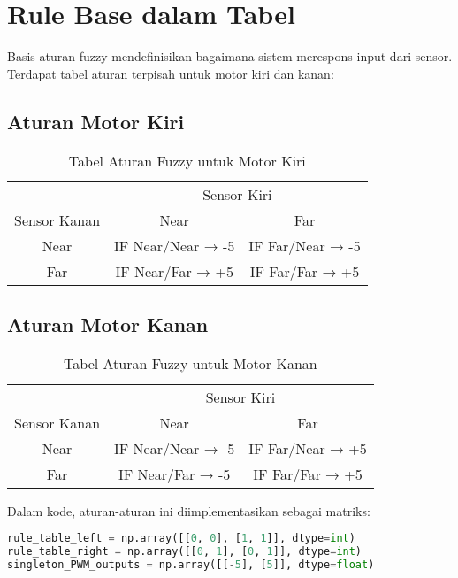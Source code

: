 \documentclass[a4paper,11pt]{article}
\begin{document}
\section{Rule Base dalam Tabel}
Basis aturan fuzzy mendefinisikan bagaimana sistem merespons input dari sensor. Terdapat tabel aturan terpisah untuk motor kiri dan kanan:

\subsection{Aturan Motor Kiri}
\begin{table}[H]
\centering
\begin{tabular}{|c|c|c|}
\hline
\multicolumn{1}{|c|}{} & \multicolumn{2}{c|}{Sensor Kiri} \\
\cline{2-3}
\multicolumn{1}{|c|}{Sensor Kanan} & Near & Far \\
\hline
Near & IF Near/Near → -5 & IF Far/Near → -5 \\
\hline
Far & IF Near/Far → +5 & IF Far/Far → +5 \\
\hline
\end{tabular}
\caption{Tabel Aturan Fuzzy untuk Motor Kiri}
\end{table}

\subsection{Aturan Motor Kanan}
\begin{table}[H]
\centering
\begin{tabular}{|c|c|c|}
\hline
\multicolumn{1}{|c|}{} & \multicolumn{2}{c|}{Sensor Kiri} \\
\cline{2-3}
\multicolumn{1}{|c|}{Sensor Kanan} & Near & Far \\
\hline
Near & IF Near/Near → -5 & IF Far/Near → +5 \\
\hline
Far & IF Near/Far → -5 & IF Far/Far → +5 \\
\hline
\end{tabular}
\caption{Tabel Aturan Fuzzy untuk Motor Kanan}
\end{table}

Dalam kode, aturan-aturan ini diimplementasikan sebagai matriks:

\begin{lstlisting}[language=Python, caption=Implementasi Tabel Aturan]
rule_table_left = np.array([[0, 0], [1, 1]], dtype=int)
rule_table_right = np.array([[0, 1], [0, 1]], dtype=int)
singleton_PWM_outputs = np.array([[-5], [5]], dtype=float)
\end{lstlisting}
\end{document}

